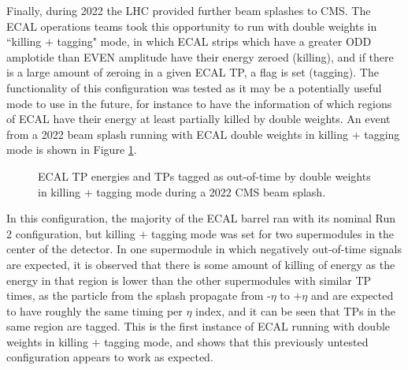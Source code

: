Finally, during 2022 the LHC provided further beam splashes to CMS. The ECAL operations teams took this opportunity to run with double weights in ``killing $+$ tagging" mode, in which ECAL strips which have a greater ODD amplotide than EVEN amplitude have their energy zeroed (killing), and if there is a large amount of zeroing in a given ECAL TP, a flag is set (tagging). The functionality of this configuration was tested as it may be a potentially useful mode to use in the future, for instance to have the information of which regions of ECAL have their energy at least partially killed by double weights. An event from a 2022 beam splash running with ECAL double weights in killing $+$ tagging mode is shown in Figure \ref{fig:2022_BeamSplash_DWTagging}. 

\begin{figure}[H]%
    \setcounter{subfigure}{0}
    \centering
    \caption{ECAL TP energies and TPs tagged as out-of-time by double weights in killing $+$ tagging mode during a 2022 CMS beam splash. \label{fig:2022_BeamSplash_DWTagging}}%
\end{figure} 

In this configuration, the majority of the ECAL barrel ran with its nominal Run 2 configuration, but killing $+$ tagging mode was set for two supermodules in the center of the detector. In one supermodule in which negatively out-of-time signals are expected, it is observed that there is some amount of killing of energy as the energy in that region is lower than the other supermodules with similar TP times, as the particle from the splash propagate from -$\eta$ to $+\eta$ and are expected to have roughly the same timing per $\eta$ index, and it can be seen that TPs in the same region are tagged. This is the first instance of ECAL running with double weights in killing $+$ tagging mode, and shows that this previously untested configuration appears to work as expected. 

